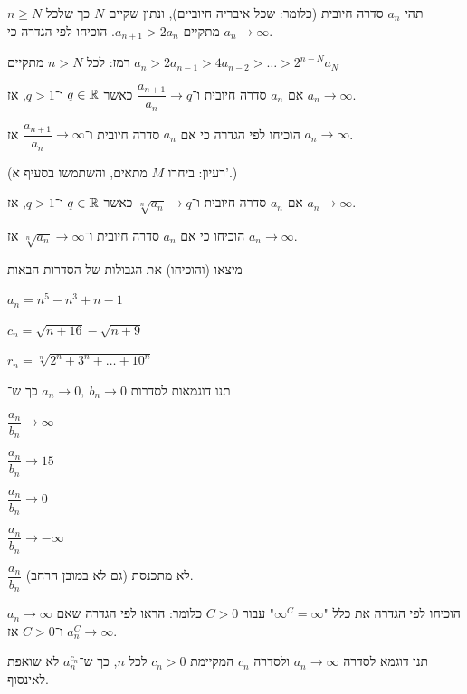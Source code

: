 \documentclass{infi-ex}
\begin{document}
\makeextitle

\begin{question}
\begin{parts}
  \item תהי $a_n$ סדרה חיובית (כלומר: שכל איבריה חיוביים), ונתון שקיים $N$ כך שלכל $n\ge N$ מתקיים $a_{n+1}>2a_n$. הוכיחו לפי הגדרה כי $a_n\to\infty$.

  רמז: לכל $n>N$ מתקיים $a_n>2a_{n-1}>4a_{n-2}>\dots>2^{n-N}a_N$
  \item {} אם $a_n$ סדרה חיובית ו־$\dfrac{a_{n+1}}{a_n}\to q$ כאשר $q\in\mathbb{R}$ ו־$q>1$, אז $a_n\to\infty$.

   הוכיחו לפי הגדרה כי אם $a_n$ סדרה חיובית ו־$\dfrac{a_{n+1}}{a_n}\to\infty$ אז $a_n\to\infty$.

  (רעיון: ביחרו $M$ מתאים, והשתמשו בסעיף א'.)
  \item {} אם $a_n$ סדרה חיובית ו־$\sqrt[n]{a_n}\to q$ כאשר $q\in\mathbb{R}$ ו־$q>1$, אז $a_n\to\infty$.

   הוכיחו כי אם $a_n$ סדרה חיובית ו־$\sqrt[n]{a_n}\to\infty$ אז $a_n\to\infty$.
\end{parts}
\end{question}

\begin{question}
מיצאו (והוכיחו) את הגבולות של הסדרות הבאות
\begin{parts}
  \item $a_n=n^5-n^3+n-1$
  \item $c_n=\sqrt{n+16}-\sqrt{n+9}$
  \item $r_n=\sqrt[n]{2^n+3^n+\dots+10^n}$
\end{parts}
\end{question}

\begin{question}
תנו דוגמאות לסדרות $a_n\to0,\ b_n\to0$ כך ש־
\begin{parts}
  \item $\dfrac{a_n}{b_n}\to\infty$
  \item $\dfrac{a_n}{b_n}\to15$
  \item $\dfrac{a_n}{b_n}\to0$
  \item $\dfrac{a_n}{b_n}\to-\infty$
  \item $\dfrac{a_n}{b_n}$ לא מתכנסת (גם לא במובן הרחב).
\end{parts}
\end{question}

\begin{question}
\begin{parts}
  \item הוכיחו לפי הגדרה את כלל "$\infty^C=\infty$" עבור $C>0$ כלומר: הראו לפי הגדרה שאם $a_n\to\infty$ ו־$C>0$ אז $a_n^C\to\infty$.
  \item תנו דוגמא לסדרה $a_n\to\infty$ ולסדרה $c_n$ המקיימת $c_n>0$ לכל $n$, כך ש־$a_n^{c_n}$ לא שואפת לאינסוף.
\end{parts}
\end{question}
\end{document}
